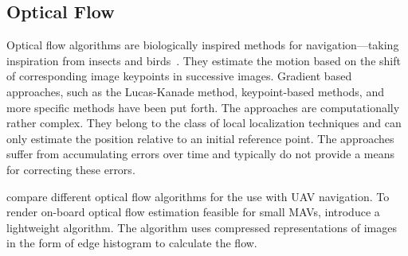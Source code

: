 
\subsection{Optical Flow}
\label{sec:opticalflow}

Optical flow algorithms are biologically inspired methods for navigation---taking inspiration from insects and birds~\cite{ruffier2003bio}. They estimate the motion based on the shift of corresponding image keypoints in successive images. Gradient based approaches, such as the Lucas-Kanade method, keypoint-based methods, and more specific methods have been put forth. The approaches are computationally rather complex. They belong to the class of local localization techniques and can only estimate the position relative to an initial reference point. The approaches suffer from accumulating errors over time and typically do not provide a means for correcting these errors.

\citet{chao2013survey} compare different optical flow algorithms for the use with UAV navigation. To render on-board optical flow estimation feasible for small MAVs, \citet{mcguire2016local} introduce a lightweight algorithm. The algorithm uses compressed representations of images in the form of edge histogram to calculate the flow.   